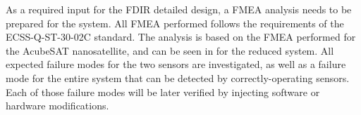 \documentclass[a4paper,nobib]{tufte-book}
\begin{document}
As a required input for the \ac{FDIR} detailed design, a \ac{FMEA} analysis needs to be prepared for the system. All \ac{FMEA} performed follows the requirements of the ECSS-Q-ST-30-02C standard.\autocite{ECSS-Q-ST-30-02C} The analysis is based on the \ac{FMEA} performed for the AcubeSAT nanosatellite,\autocite{retselis_acubesat_fmea_2020} and can be seen in  for the reduced system. All expected failure modes for the two sensors are investigated, as well as a failure mode for the entire system that can be detected by correctly-operating sensors. Each of those failure modes will be later verified by injecting software or hardware modifications.
\end{document}
